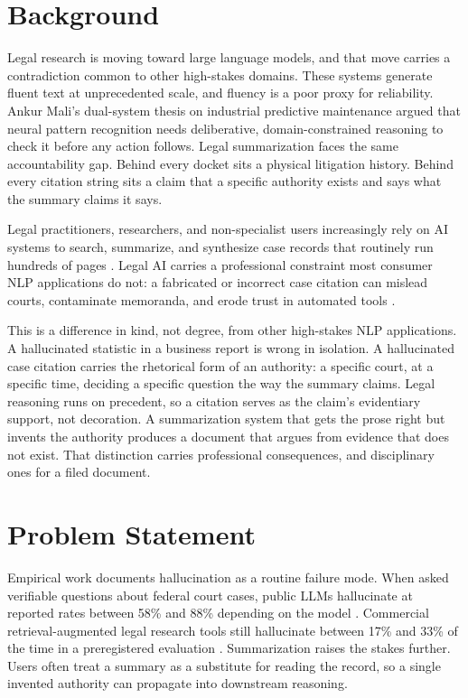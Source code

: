 \section{Background}
\label{sec:intro-background}

Legal research is moving toward large language models, and that move carries a contradiction common to other high-stakes domains. These systems generate fluent text at unprecedented scale, and fluency is a poor proxy for reliability. Ankur Mali's dual-system thesis on industrial predictive maintenance argued that neural pattern recognition needs deliberative, domain-constrained reasoning to check it before any action follows. Legal summarization faces the same accountability gap. Behind every docket sits a physical litigation history. Behind every citation string sits a claim that a specific authority exists and says what the summary claims it says.

Legal practitioners, researchers, and non-specialist users increasingly rely on AI systems to search, summarize, and synthesize case records that routinely run hundreds of pages \cite{shen2022multilexsum}. Legal AI carries a professional constraint most consumer NLP applications do not: a fabricated or incorrect case citation can mislead courts, contaminate memoranda, and erode trust in automated tools \cite{dahl2024largelegalfictions,magesh2025hallucinationfree,lai2023llmslegal}.

This is a difference in kind, not degree, from other high-stakes NLP applications. A hallucinated statistic in a business report is wrong in isolation. A hallucinated case citation carries the rhetorical form of an authority: a specific court, at a specific time, deciding a specific question the way the summary claims. Legal reasoning runs on precedent, so a citation serves as the claim's evidentiary support, not decoration. A summarization system that gets the prose right but invents the authority produces a document that argues from evidence that does not exist. That distinction carries professional consequences, and disciplinary ones for a filed document.

\section{Problem Statement}
\label{sec:intro-problem}

Empirical work documents hallucination as a routine failure mode. When asked verifiable questions about federal court cases, public LLMs hallucinate at reported rates between 58\% and 88\% depending on the model \cite{dahl2024largelegalfictions}. Commercial retrieval-augmented legal research tools still hallucinate between 17\% and 33\% of the time in a preregistered evaluation \cite{magesh2025hallucinationfree}. Summarization raises the stakes further. Users often treat a summary as a substitute for reading the record, so a single invented authority can propagate into downstream reasoning.

